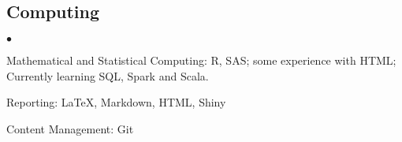 \documentclass[margin,line]{res}
\newenvironment{list2}{
  \begin{list}{$\bullet$}{%
      \setlength{\itemsep}{0in}
      \setlength{\parsep}{0in} \setlength{\parskip}{0in}
      \setlength{\topsep}{0in} \setlength{\partopsep}{0in}
      \setlength{\leftmargin}{0.2in}}}{\end{list}}
\begin{document}
\begin{resume}
\section{\sc Computing}
\begin{list2}
\newcommand{\latex}{\LaTeX\xspace}	
\item Mathematical and Statistical Computing:  R, SAS; some experience with HTML;\\
 Currently learning  SQL, Spark and Scala.
\item Reporting:  \LaTeX, Markdown, HTML, Shiny
\item Content Management: Git



\end{list2}











\end{resume}
\end{document}
